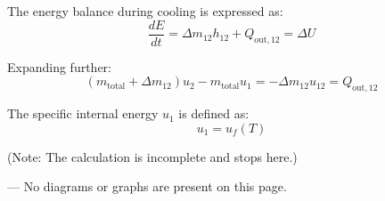 The energy balance during cooling is expressed as:  
\[
\frac{dE}{dt} = \Delta m_{12} h_{12} + Q_{\text{out},12} = \Delta U
\]  

Expanding further:  
\[
(m_{\text{total}} + \Delta m_{12}) u_2 - m_{\text{total}} u_1 = -\Delta m_{12} u_{12} = Q_{\text{out},12}
\]  

The specific internal energy \( u_1 \) is defined as:  
\[
u_1 = u_f(T)
\]  

(Note: The calculation is incomplete and stops here.)  

---  
No diagrams or graphs are present on this page.